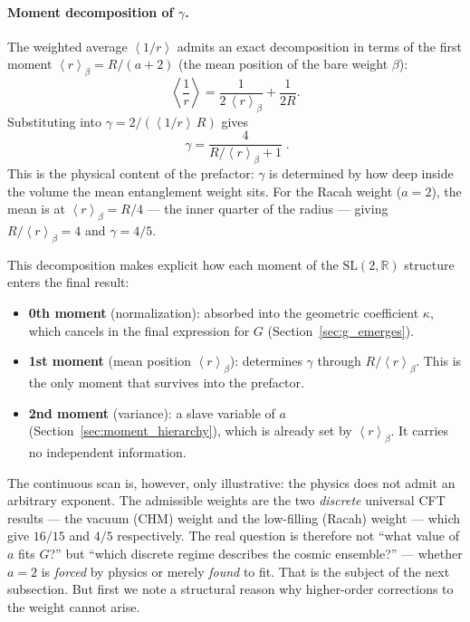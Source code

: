 \documentclass[11pt,letterpaper]{article}
\newcommand{\av}[1]{\left\langle #1 \right\rangle}
\begin{document}
\paragraph{Moment decomposition of $\gamma$.}
The weighted average $\av{1/r}$ admits an exact decomposition in terms of the
first moment $\av{r}_\beta = R/(a+2)$ (the mean position of the bare weight
$\beta$):
\begin{equation}
  \av{\frac{1}{r}} = \frac{1}{2\,\av{r}_\beta} + \frac{1}{2R}.
  \label{eq:moment_decomp}
\end{equation}
Substituting into $\gamma = 2/(\av{1/r}\,R)$ gives
\begin{equation}
  \boxed{\;\gamma = \frac{4}{R/\av{r}_\beta + 1}\;.}
  \label{eq:gamma_moment}
\end{equation}
This is the physical content of the prefactor: $\gamma$ is determined by
how deep inside the volume the mean entanglement weight sits. For the
Racah weight ($a = 2$), the mean is at $\av{r}_\beta = R/4$ --- the inner
quarter of the radius --- giving $R/\av{r}_\beta = 4$ and $\gamma = 4/5$.

This decomposition makes explicit how each moment of the
$\mathrm{SL}(2,\mathbb{R})$ structure enters the final result:
\begin{itemize}
  \item \textbf{0th moment} (normalization): absorbed into the geometric
    coefficient $\kappa$, which cancels in the final expression for $G$
    (Section~\ref{sec:g_emerges}).
  \item \textbf{1st moment} (mean position $\av{r}_\beta$): determines
    $\gamma$ through $R/\av{r}_\beta$. This is the only moment that
    survives into the prefactor.
  \item \textbf{2nd moment} (variance): a slave variable of $a$
    (Section~\ref{sec:moment_hierarchy}), which is already set by
    $\av{r}_\beta$. It carries no independent information.
\end{itemize}

The continuous scan is, however, only illustrative: the physics does
not admit an arbitrary exponent. The admissible weights are the two
\emph{discrete} universal CFT results --- the vacuum (CHM) weight and the
low-filling (Racah) weight --- which give $16/15$ and $4/5$ respectively. The
real question is therefore not ``what value of $a$ fits $G$?'' but ``which
discrete regime describes the cosmic ensemble?'' --- whether $a = 2$ is
\emph{forced} by physics or merely \emph{found} to fit. That is the subject of
the next subsection. But first we note a structural reason why higher-order
corrections to the weight cannot arise.
\end{document}
